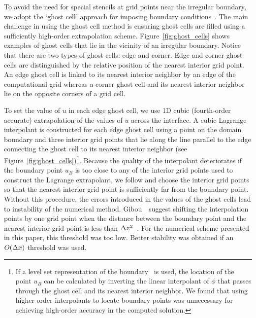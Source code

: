 \documentclass[fleqn,12pt,twoside]{article}
\begin{document}
To avoid the need for special stencils at grid points near the irregular 
boundary, we adopt the `ghost cell' approach for imposing boundary 
conditions~\cite{gibou_2005,ito_2005,fedkiw_1999,osher_fedkiw_book}.
The main challenge in using the ghost cell method is ensuring ghost cells 
are filled using a sufficiently high-order extrapolation scheme. 
Figure~\ref{fig:ghost_cells} shows examples of ghost cells that lie in the 
vicinity of an irregular boundary.  Notice that there are two types of ghost 
cells:  edge and corner.  Edge and corner ghost cells are distinguished by 
the relative position of the nearest interior grid point.  An edge ghost cell 
is linked to its nearest interior neighbor by an edge of the computational 
grid whereas a corner ghost cell and its nearest interior neighbor lie on the 
opposite corners of a grid cell.

To set the value of $u$ in each edge ghost cell, we use 1D cubic 
(\ie fourth-order accurate) extrapolation of the values of $u$ across the 
interface.  A cubic Lagrange interpolant is constructed for each edge ghost 
cell using a point on the domain boundary and three interior grid points that 
lie along the line parallel to the edge connecting the ghost cell to its 
nearest interior neighbor (see Figure~\ref{fig:ghost_cells})\footnote{If
a level set representation of the boundary~\cite{osher_fedkiw_book} is used, 
the location of the point $u_B$ can be calculated by inverting the linear 
interpolant of $\phi$ that passes through the ghost cell and its nearest
interior neighbor.  We found that using higher-order interpolants to 
locate boundary points was unnecessary for achieving high-order accuracy in 
the computed solution.}.  Because the quality of the interpolant deteriorates 
if the boundary point $u_B$ is too close to any of the interior grid points 
used to construct the Lagrange extrapolant, we follow \cite{gibou_2005} and 
choose the interior grid points so that the nearest interior grid point is 
sufficiently far from the boundary point.  Without this procedure, the errors 
introduced in the values of the ghost cells lead to instability of the 
numerical method.
Gibou~\etal~suggest shifting the interpolation points by one grid point 
when the distance between the boundary point and the nearest interior grid 
point is less than $\Delta x^2$~\cite{gibou_2005}.  For the numerical scheme 
presented in this paper, this threshold was too low.  Better stability was 
obtained if an $O(\Delta x)$ threshold was used.
\end{document}
